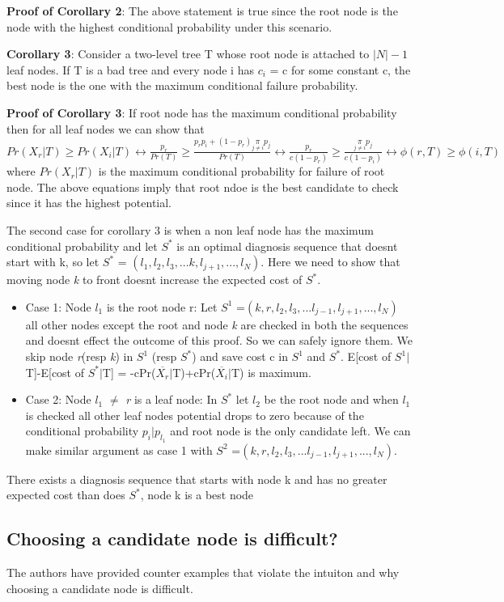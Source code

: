 \documentclass[10pt]{sigplan-proc-varsize}
\begin{document}
{\bf Proof of Corollary 2}: The above statement is true since the root node is the node with the highest conditional probability under this scenario.

{\bf Corollary 3}: Consider a two-level tree T whose root node is attached to $|N|-1$ leaf nodes. If T is a bad tree and every node i has $c_i$ = c for some constant c, the best node is the one with the maximum conditional failure probability.

{\bf Proof of Corollary 3}: If root node has the maximum conditional probability then for all leaf nodes we can show that $Pr(X_r|T) \geq Pr(X_i|T) \leftrightarrow \frac{p_r}{Pr(T)} \geq \frac{p_rp_i+(1-p_r) \underset{j{\neq}i}{\pi}p_j}{Pr(T)} \leftrightarrow \frac{p_r}{c(1-p_r)} \geq \frac{\underset{j{\neq}i}{\pi} p_j}{c(1-p_i)} \leftrightarrow \phi(r,T)\geq\phi(i,T)$ where $Pr(X_r|T)$ is the maximum conditional probability for failure of root node.  The above equations imply that root ndoe is the best candidate to check since it has the highest potential. 

The second case for corollary 3 is when a non leaf node has the  maximum conditional probability and let $S^*$ is an optimal diagnosis sequence that doesnt start with k, so let $S^*$ = $(l_1,l_2,l_3,...k,l_{j+1},...,l_N)$. Here we need to show that moving node {\it k} to front doesnt increase the expected cost of $S^*$.
\begin{itemize}
  \item Case 1: Node $l_1$ is the root node r: Let $S^1$ =$(k,r,l_2,l_3,...l_{j-1},l_{j+1},...,l_N)$ all other nodes except the root and node {\it k} are checked in both the sequences and doesnt effect the outcome of this proof. So we can safely ignore them. We skip node {\it r}(resp {\it k}) in $S^1$ (resp $S^*$) and save cost c in $S^1$ and $S^*$. E[cost of $S^1|$T]-E[cost of $S^*|$T] = -cPr($\overline{X_r}|$T)+cPr($\overline{X_i}|$T) is maximum.
\item Case 2: Node $l_1$ $\neq$ {\it r} is a leaf node: In $S^*$ let $l_2$ be the root node and when $l_1$ is checked all other leaf nodes potential drops to zero because of the conditional probability $p_i|p_{l_1}$ and root node is the only candidate left. We can make similar argument  as case 1 with $S^2$ =$(k,r,l_2,l_3,...l_{j-1},l_{j+1},...,l_N).$
\end{itemize}
There exists a diagnosis sequence that starts with node k and has no greater expected cost than does $S^*$, node k is a best node

\subsection{Choosing a candidate node is difficult?}
The authors have provided counter examples that violate the intuiton and why choosing a candidate node is difficult. 
\end{document}
